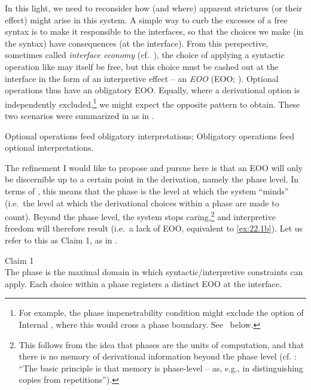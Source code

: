 \documentclass[output=paper]{langsci/langscibook}
\begin{document}
In this light, we need to reconsider how (and where) apparent strictures (or
their effect) might arise in this system. A simple way to curb the excesses of
a free syntax is to make it responsible to the interfaces, so that the choices
we make (in the syntax) have consequences (at the interface). From this
perspective, sometimes called \emph{interface economy} (cf.\
\citealt{Reinhart1995,Fox2000,Chomsky2001,BibRich2006}), the choice of applying
a syntactic operation like \isi{Merge} may itself be free, but this choice must be
cashed out at the interface in the form of an interpretive effect – an
\glsunset{EOO}\emph{\glsdesc{EOO}} (\gls{EOO}; \citealt[34]{Chomsky2001}).
Optional operations thus have an obligatory \gls{EOO}. Equally, where a
derivational option is independently excluded,\footnote{For example, the phase
    impenetrability condition might exclude the option of Internal \isi{Merge},
    where this would cross a phase boundary. See~\Cref{sub:22.2.2}
below.\label{fn:22.2}} we might expect the opposite pattern to obtain. These
two scenarios were summarized in \citet{BibRich2006} as in \REF{ex:22.1}.

\ea\label{ex:22.1}
    \ea\label{ex:22.1a} Optional operations feed obligatory interpretations;
    \ex\label{ex:22.1b} Obligatory operations feed optional interpretations.
    \z
\z

The refinement I would like to propose and pursue here is that an \gls{EOO}
will only be discernible up to a certain point in the derivation, namely the
phase level.  In terms of \citet{BibRich2006}, this means that the phase is the
level at which the system \enquote{minds} (i.e.\ the level at which the
derivational choices within a phase are made to count). Beyond the phase\is{phases} level,
the system stops caring,\footnote{This follows from the idea that phases are
    the units of computation, and that there is no memory of derivational
information beyond the phase\is{phases} level (cf. \citealt[8]{Chomsky2015}: \enquote{The
basic principle is that memory is phase-level -- as, e.g., in distinguishing
copies from repetitions}).\label{fn:22.3}} and interpretive freedom will
therefore result (i.e.\ a lack of \gls{EOO}, equivalent to \ref{ex:22.1b}).
Let us refer to this as Claim 1, as in \REF{ex:22.2}.

\ea\label{ex:22.2}Claim 1\\
    The phase is the maximal domain in which syntactic\slash interpretive constraints
    can apply. Each choice within a phase\is{phases} registers a distinct \gls{EOO} at the
    interface.
\z
\end{document}
